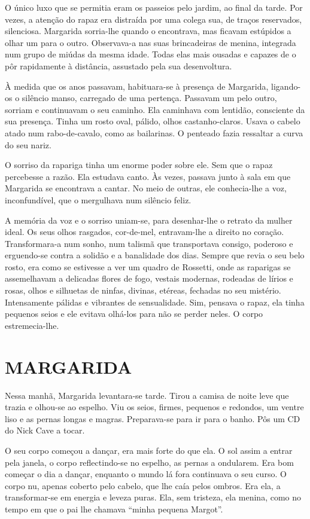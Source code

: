 O único luxo que se permitia eram os passeios pelo jardim, ao final da
tarde. Por vezes, a atenção do rapaz era distraída por uma colega sua,
de traços reservados, silenciosa. Margarida sorria-lhe quando o
encontrava, mas ficavam estúpidos a olhar um para o outro. Observava-a
nas suas brincadeiras de menina, integrada num grupo de miúdas da mesma
idade. Todas elas mais ousadas e capazes de o pôr rapidamente à
distância, assustado pela sua desenvoltura.

À medida que os anos passavam, habituara-se à presença de Margarida,
ligando-os o silêncio manso, carregado de uma pertença. Passavam um pelo
outro, sorriam e continuavam o seu caminho. Ela caminhava com lentidão,
consciente da sua presença. Tinha um rosto oval, pálido, olhos
castanho-claros. Usava o cabelo atado num rabo-de-cavalo, como as
bailarinas. O penteado fazia ressaltar a curva do seu nariz.

O sorriso da rapariga tinha um enorme poder sobre ele. Sem que o rapaz
percebesse a razão. Ela estudava canto. Às vezes, passava junto à sala
em que Margarida se encontrava a cantar. No meio de outras, ele
conhecia-lhe a voz, inconfundível, que o mergulhava num silêncio feliz.

A memória da voz e o sorriso uniam-se, para desenhar-lhe o retrato da
mulher ideal. Os seus olhos rasgados, cor-de-mel, entravam-lhe a direito
no coração. Transformara-a num sonho, num talismã que transportava
consigo, poderoso e erguendo-se contra a solidão e a banalidade dos
dias. Sempre que revia o seu belo rosto, era como se estivesse a ver um
quadro de Rossetti, onde as raparigas se assemelhavam a delicadas flores
de fogo, vestais modernas, rodeadas de lírios e rosas, olhos e silhuetas
de ninfas, divinas, etéreas, fechadas no seu mistério. Intensamente
pálidas e vibrantes de sensualidade. Sim, pensava o rapaz, ela tinha
pequenos seios e ele evitava olhá-los para não se perder neles. O corpo
estremecia-lhe.

\section{MARGARIDA}

Nessa manhã, Margarida levantara-se tarde. Tirou a camisa de noite leve
que trazia e olhou-se ao espelho. Viu os seios, firmes, pequenos e
redondos, um ventre liso e as pernas longas e magras. Preparava-se para
ir para o banho. Pôs um CD do Nick Cave a tocar.

O seu corpo começou a dançar, era mais forte do que ela. O sol assim a
entrar pela janela, o corpo reflectindo-se no espelho, as pernas a
ondularem. Era bom começar o dia a dançar, enquanto o mundo lá fora
continuava o seu curso. O corpo nu, apenas coberto pelo cabelo, que lhe
caía pelos ombros. Era ela, a transformar-se em energia e leveza puras.
Ela, sem tristeza, ela menina, como no tempo em que o pai lhe chamava
``minha pequena Margot''.

